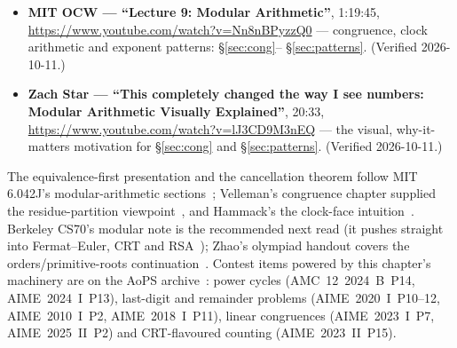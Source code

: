 \begin{rulebox}
\begin{itemize}
\item \textbf{MIT OCW --- ``Lecture 9: Modular Arithmetic''}, 1:19:45,
\url{https://www.youtube.com/watch?v=Nn8nBPyzzQ0} --- congruence,
clock arithmetic and exponent patterns: \S\ref{sec:cong}--%
\S\ref{sec:patterns}. (Verified 2026-10-11.)
\item \textbf{Zach Star --- ``This completely changed the way I see
numbers: Modular Arithmetic Visually Explained''}, 20:33,
\url{https://www.youtube.com/watch?v=lJ3CD9M3nEQ} --- the visual,
why-it-matters motivation for \S\ref{sec:cong} and \S\ref{sec:patterns}.
(Verified 2026-10-11.)
\end{itemize}
\end{rulebox}

\chapternotes
The equivalence-first presentation and the cancellation theorem follow
MIT 6.042J's modular-arithmetic sections~\cite{mcs}; Velleman's congruence
chapter supplied the residue-partition viewpoint~\cite{velleman}, and
Hammack's the clock-face intuition~\cite{hammack}. Berkeley CS70's
modular note is the recommended next read (it pushes straight into
Fermat--Euler, CRT and RSA~\cite{cs70}); Zhao's olympiad handout covers the
orders/primitive-roots continuation~\cite{zhao}. Contest items powered by
this chapter's machinery are on the AoPS archive~\cite{aops-amc}: power
cycles (AMC~12~2024~B~P14, AIME~2024~I~P13), last-digit and remainder
problems (AIME~2020~I~P10--12, AIME~2010~I~P2, AIME~2018~I~P11), linear
congruences (AIME~2023~I~P7, AIME~2025~II~P2) and CRT-flavoured counting
(AIME~2023~II~P15).

